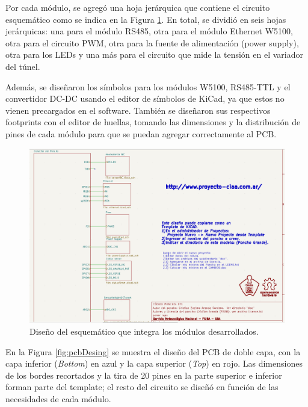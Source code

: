 Por cada módulo, se agregó una hoja jerárquica que contiene el circuito esquemático como se indica en la Figura \ref{fig:esquematicoPonchoDatalogger}. En total, se dividió en seis hojas jerárquicas: una para el módulo RS485, otra para el módulo Ethernet W5100, otra para el circuito PWM, otra para la fuente de alimentación (power supply), otra para los LEDs y una más para el circuito que mide la tensión en el variador del túnel.

Además, se diseñaron los símbolos para los módulos W5100, RS485-TTL y el convertidor DC-DC usando el editor de símbolos de KiCad, ya que estos no vienen precargados en el software. También se diseñaron sus respectivos footprints con el editor de huellas, tomando las dimensiones y la distribución de pines de cada módulo para que se puedan agregar correctamente al PCB.

\begin{figure}[H]
    \centering
    \includegraphics[width=0.95\linewidth]{Figuras/datalogger/Hardware/esquematicoPonchoDatalogger.png}
    \caption{Diseño del esquemático que integra los módulos desarrollados.}
    \label{fig:esquematicoPonchoDatalogger}
\end{figure}




En la Figura \ref{fig:pcbDesing} se muestra el diseño del PCB de doble capa, con la capa inferior (\textit{Bottom}) en azul y la capa superior (\textit{Top}) en rojo. Las dimensiones de los bordes recortados y la tira de 20 pines en la parte superior e inferior forman parte del template; el resto del circuito se diseñó en función de las necesidades de cada módulo.


